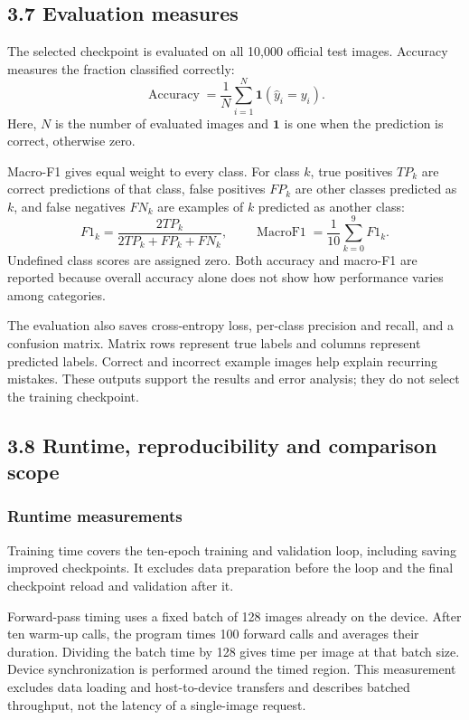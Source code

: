 \subsection{3.7 Evaluation measures}
The selected checkpoint is evaluated on all 10,000 official test images.
Accuracy measures the fraction classified correctly:
\[
\operatorname{Accuracy}=\frac{1}{N}\sum_{i=1}^{N}
\mathbf{1}(\hat y_i=y_i).
\]
Here, $N$ is the number of evaluated images and $\mathbf{1}$ is one when the
prediction is correct, otherwise zero.

Macro-F1 gives equal weight to every class. For class $k$, true positives
$TP_k$ are correct predictions of that class, false positives $FP_k$ are other
classes predicted as $k$, and false negatives $FN_k$ are examples of $k$
predicted as another class:
\[
F1_k=\frac{2TP_k}{2TP_k+FP_k+FN_k},
\qquad
\operatorname{MacroF1}=\frac{1}{10}\sum_{k=0}^{9}F1_k.
\]
Undefined class scores are assigned zero. Both accuracy and macro-F1 are
reported because overall accuracy alone does not show how performance varies
among categories.

The evaluation also saves cross-entropy loss, per-class precision and recall,
and a confusion matrix. Matrix rows represent true labels and columns represent
predicted labels. Correct and incorrect example images help explain recurring
mistakes. These outputs support the results and error analysis; they do not
select the training checkpoint.


\subsection{3.8 Runtime, reproducibility and comparison scope}
\subsubsection{Runtime measurements}
Training time covers the ten-epoch training and validation loop, including
saving improved checkpoints. It excludes data preparation before the loop and
the final checkpoint reload and validation after it.

Forward-pass timing uses a fixed batch of 128 images already on the device.
After ten warm-up calls, the program times 100 forward calls and averages their
duration. Dividing the batch time by 128 gives time per image at that batch
size. Device synchronization is performed around the timed region. This
measurement excludes data loading and host-to-device transfers and describes
batched throughput, not the latency of a single-image request.


